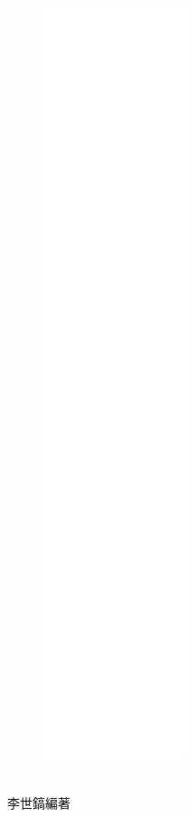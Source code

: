 \documentclass[a5paper,12pt]{memoir}
\begin{document}
\linespread{1.25}
\begin{figure}
\includegraphics[height=220mm]{cover.png}
\end{figure}
\hfill
\vfill
{}\\
{李世鎬\hspace{14pt}編著}
\vspace{64pt}
\frontmatter
\newpage
\addtolength{\topmargin}{20mm}
\linespread{1.25}

\mainmatter
\linespread{1.25}
\begin{multicols}{3}

\end{multicols}
\appendix
\newpage

\end{document}

